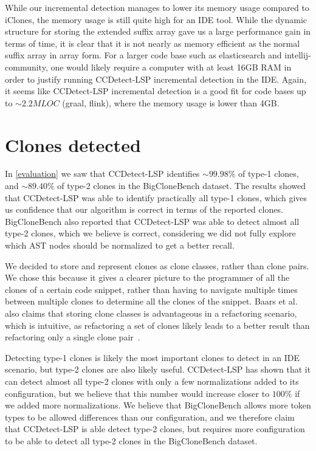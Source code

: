 While our incremental detection manages to lower its memory usage compared to iClones, the
memory usage is still quite high for an IDE tool. While the dynamic structure for storing
the extended suffix array gave us a large performance gain in terms of time, it is clear
that it is not nearly as memory efficient as the normal suffix array in array form. For a
larger code base such as elasticsearch and intellij-community, one would likely require a
computer with at least 16GB RAM in order to justify running CCDetect-LSP incremental
detection in the IDE. Again, it seems like CCDetect-LSP incremental detection is a good
fit for code bases up to ${\sim}2.2MLOC$ (graal, flink), where the memory usage is lower
than 4GB.

\section{Clones detected}

In \cref{evaluation} we saw that CCDetect-LSP identifies ${\sim}99.98\%$ of type-1 clones,
and ${\sim}89.40\%$ of type-2 clones in the BigCloneBench dataset. The results showed that
CCDetect-LSP was able to identify practically all type-1 clones, which gives us confidence
that our algorithm is correct in terms of the reported clones. BigCloneBench also reported
that CCDetect-LSP was able to detect almost all type-2 clones, which we believe is
correct, considering we did not fully explore which AST nodes should be normalized to get
a better recall.

We decided to store and represent clones as clone classes, rather than clone pairs. We
chose this because it gives a clearer picture to the programmer of all the clones of a
certain code snippet, rather than having to navigate multiple times between multiple
clones to determine all the clones of the snippet. Baars et al. also claims that storing
clone classes is advantageous in a refactoring scenario, which is intuitive, as
refactoring a set of clones likely leads to a better result than refactoring only a single
clone pair~\cite{TowardsAutomatedRefactoring}.

Detecting type-1 clones is likely the most important clones to detect in an IDE scenario,
but type-2 clones are also likely useful. CCDetect-LSP has shown that it can detect almost
all type-2 clones with only a few normalizations added to its configuration, but we
believe that this number would increase closer to $100\%$ if we added more normalizations.
We believe that BigCloneBench allows more token types to be allowed differences than our
configuration, and we therefore claim that CCDetect-LSP is able detect type-2 clones, but
requires more configuration to be able to detect all type-2 clones in the BigCloneBench
dataset.

